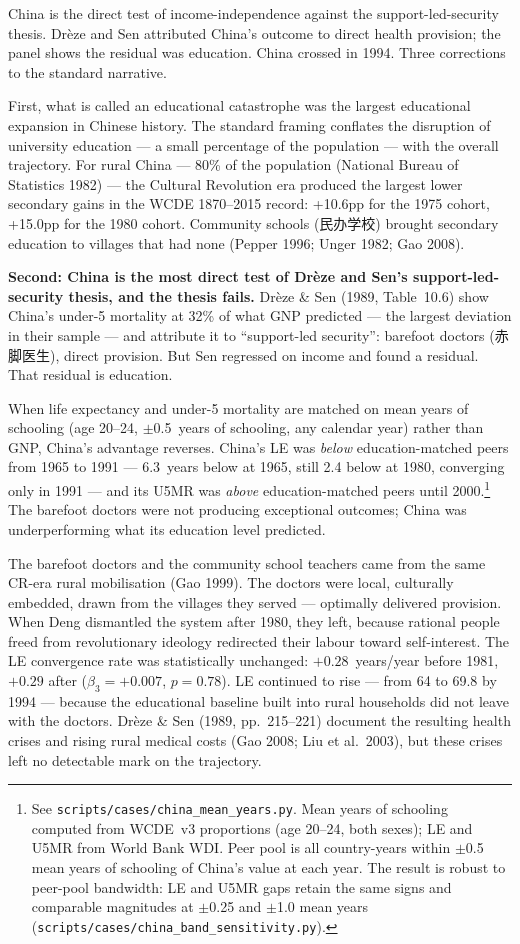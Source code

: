 \documentclass[12pt,letterpaper]{article}
\begin{document}
China is the direct test of income-independence against the
support-led-security thesis. Drèze and Sen attributed China's outcome
to direct health provision; the panel shows the residual was
education. China crossed in 1994. Three corrections to the standard
narrative.

First, what is called an educational catastrophe was
the largest educational expansion in Chinese history. The standard
framing conflates the disruption of university education --- a
small percentage of the population --- with the overall
trajectory. For rural China --- 80\% of the population
(National Bureau of Statistics 1982) --- the Cultural Revolution era
produced the largest lower secondary gains in the WCDE
1870--2015 record: +10.6pp for the 1975 cohort, +15.0pp for the 1980
cohort. Community schools (民办学校) brought secondary
education to villages that had none (Pepper 1996; Unger 1982; Gao 2008).

\textbf{Second: China is the most direct test of Drèze and Sen's
support-led-security thesis, and the thesis fails.} Drèze \& Sen
(1989, Table~10.6) show China's under-5 mortality at 32\% of what GNP
predicted --- the largest deviation in their sample --- and attribute it
to ``support-led security'': barefoot doctors (赤脚医生), direct
provision. But Sen regressed on income and found a residual. That
residual is education.

When life expectancy and under-5 mortality are matched on mean years of
schooling (age 20--24, $\pm$0.5~years of schooling, any calendar year)
rather than GNP, China's advantage reverses. China's LE was
\emph{below} education-matched peers from 1965 to 1991 --- 6.3~years
below at 1965, still 2.4 below at 1980, converging only in 1991 --- and
its U5MR was \emph{above} education-matched peers until 2000.\footnote{See
\texttt{scripts/cases/china\_mean\_years.py}. Mean years of schooling
computed from WCDE~v3 proportions (age 20--24, both sexes); LE and U5MR
from World Bank WDI. Peer pool is all country-years within $\pm$0.5
mean years of schooling of China's value at each year. The result is robust to peer-pool bandwidth: LE and U5MR gaps retain the same signs and comparable magnitudes at $\pm$0.25 and $\pm$1.0 mean years (\texttt{scripts/cases/china\_band\_sensitivity.py}).} The barefoot
doctors were not producing exceptional outcomes; China was
underperforming what its education level predicted.

The barefoot doctors and the community school teachers came from the same
CR-era rural mobilisation (Gao 1999). The doctors were local, culturally embedded,
drawn from the villages they served --- optimally delivered provision.
When Deng dismantled the system after 1980, they left, because rational
people freed from revolutionary ideology redirected their labour toward
self-interest. The LE convergence rate was statistically unchanged:
$+0.28$~years/year before 1981, $+0.29$ after ($\beta_3 = +0.007$, $p =
0.78$). LE continued to rise --- from 64 to 69.8 by 1994 --- because
the educational baseline built into rural households did not leave with
the doctors. Drèze \& Sen (1989, pp.~215--221) document the resulting
health crises and rising rural medical costs (Gao 2008; Liu et
al.~2003), but these crises left no detectable mark on the trajectory.
\end{document}
